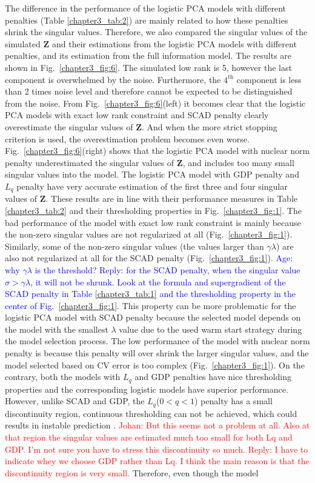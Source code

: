 The difference in the performance of the logistic PCA models with different penalties (Table \ref{chapter3_tab:2}) are mainly related to how these penalties shrink the singular values. Therefore, we also compared the singular values of the simulated $\mathbf{Z}$ and their estimations from the logistic PCA models with different penalties, and its estimation from the full information model. The results are shown in Fig.~\ref{chapter3_fig:6}. The simulated low rank is 5, however the last component is overwhelmed by the noise. Furthermore, the $4^{\text{th}}$ component is less than 2 times noise level and therefore cannot be expected to be distinguished from the noise. From Fig.~\ref{chapter3_fig:6}(left) it becomes clear that the logistic PCA models with exact low rank constraint and SCAD penalty clearly overestimate the singular values of $\mathbf{Z}$. And when the more strict stopping criterion is used, the overestimation problem becomes even worse. Fig.~\ref{chapter3_fig:6}(right) shows that the logistic PCA model with nuclear norm penalty underestimated the singular values of $\mathbf{Z}$, and includes too many small singular values into the model. The logistic PCA model with GDP penalty and $L_{q}$ penalty have very accurate estimation of the first three and four singular values of $\mathbf{Z}$. These results are in line with their performance measures in Table \ref{chapter3_tab:2} and their thresholding properties in Fig.~\ref{chapter3_fig:1}. The bad performance of the model with exact low rank constraint is mainly because the non-zero singular values are not regularized at all (Fig.~\ref{chapter3_fig:1}). Similarly, some of the non-zero singular values (the values larger than $\gamma \lambda$) are also not regularized at all for the SCAD penalty (Fig.~\ref{chapter3_fig:1}). \textcolor{blue}{Age: why $\gamma \lambda$ is the threshold? Reply: for the SCAD penalty, when the singular value $\sigma > \gamma \lambda$, it will not be shrunk. Look at the formula and supergradient of the SCAD penalty in Table \ref{chapter3_tab:1} and the thresholding property in the center of Fig.~\ref{chapter3_fig:1}.} This property can be more problematic for the logistic PCA model with SCAD penalty because the selected model depends on the model with the smallest $\lambda$ value due to the used warm start strategy during the model selection process. The low performance of the model with nuclear norm penalty is because this penalty will over shrink the larger singular values, and the model selected based on CV error is too complex (Fig.~\ref{chapter3_fig:1}). On the contrary, both the models with $L_{q}$ and GDP penalties have nice thresholding properties and the corresponding logistic models have superior performance. However, unlike SCAD and GDP, the $L_{q}$($0<q<1$) penalty has a small discontinuity region, continuous thresholding can not be achieved, which could results in instable prediction \cite{fan2001variable}. \textcolor{red}{Johan: But this seems not a problem at all. Also at that region the singular values are estimated much too small for both Lq and GDP. I'm not sure you have to stress this discontinuity so much. Reply: I have to indicate whey we choose GDP rather than Lq. I think the main reason is that the discontinuity region is very small.} Therefore, even though the model 